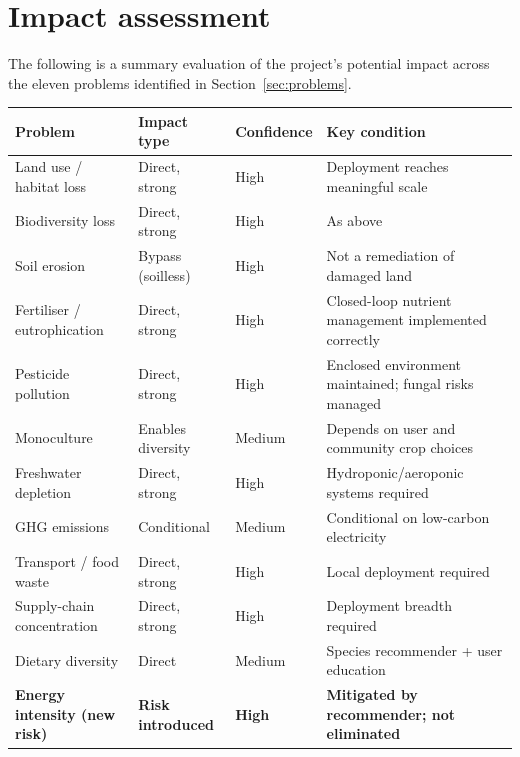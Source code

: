 
\section{Impact assessment}

The following is a summary evaluation of the project's potential impact across the eleven problems identified in Section~\ref{sec:problems}.

\begin{center}
\begin{tabular}{p{4.5cm}p{3cm}p{2cm}p{4cm}}
\toprule
\textbf{Problem} & \textbf{Impact type} & \textbf{Confidence} & \textbf{Key condition} \\
\midrule
Land use / habitat loss & Direct, strong & High & Deployment reaches meaningful scale \\
Biodiversity loss & Direct, strong & High & As above \\
Soil erosion & Bypass (soilless) & High & Not a remediation of damaged land \\
Fertiliser / eutrophication & Direct, strong & High & Closed-loop nutrient management implemented correctly \\
Pesticide pollution & Direct, strong & High & Enclosed environment maintained; fungal risks managed \\
Monoculture & Enables diversity & Medium & Depends on user and community crop choices \\
Freshwater depletion & Direct, strong & High & Hydroponic/aeroponic systems required \\
GHG emissions & Conditional & Medium & Conditional on low-carbon electricity \\
Transport / food waste & Direct, strong & High & Local deployment required \\
Supply-chain concentration & Direct, strong & High & Deployment breadth required \\
Dietary diversity & Direct & Medium & Species recommender + user education \\
\textbf{Energy intensity (new risk)} & \textbf{Risk introduced} & \textbf{High} & \textbf{Mitigated by recommender; not eliminated} \\
\bottomrule
\end{tabular}
\end{center}


